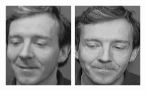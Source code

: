 \begin{figure}[ht]
 \includegraphics[width=\columnwidth/11]{ch3/figures/s3_5.png}
 \includegraphics[width=\columnwidth/11]{ch3/figures/s3_6.png}

\end{figure}

